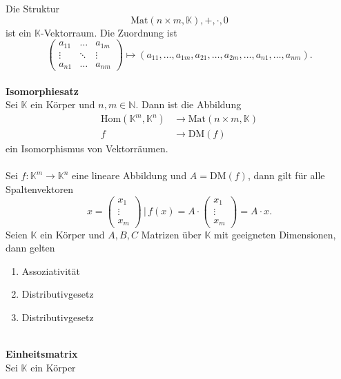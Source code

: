 \documentclass[a4paper,12pt]{article}
\newcommand{\RN}[1]{\uppercase\expandafter{\romannumeral#1}}
\numberwithin{equation}{section}
\begin{document}
Die Struktur 
\[ 
        \text{Mat}\left(n\times m,\mathbb{K}\right),+,\cdot ,0
\] 
ist ein $\mathbb{K}$-Vektorraum. Die Zuordnung ist
\[ 
        \left(\begin{matrix}
                        a_{11}&\hdots &a_{1m}\\\vdots&\ddots&\vdots\\a_{n1}&\hdots &a_{nm}
        \end{matrix}\right)\mapsto\left(a_{11},\hdots ,a_{1m},a_{21},\hdots ,a_{2m},\hdots ,a_{n1},\hdots ,a_{nm}\right)
.\] 
\hfill\\\textbf{Isomorphiesatz}\\ 
Sei $\mathbb{K}$ ein Körper und $n,m \in \mathbb{N}$. Dann ist die Abbildung
\begin{align*}
        \text{Hom}\left(\mathbb{K}^{m},\mathbb{K}^{n}\right)&\rightarrow \text{Mat}\left(n\times m,\mathbb{K}\right)\\
        f&\rightarrow \text{DM}\left(f\right)
\end{align*}
ein Isomorphismus von Vektorräumen.\\\\
Sei $f:\mathbb{K}^{m}\rightarrow \mathbb{K}^{n}$ eine lineare Abbildung und $A=\text{DM}\left(f\right)$, dann gilt für alle Spaltenvektoren
\[ 
        x=\left(\begin{matrix}
                x_1\\\vdots \\x_m
        \end{matrix}\right)\,|\, f\left(x\right)=A\cdot \left(\begin{matrix}
                x_1\\\vdots\\x_m
        \end{matrix}\right)=A\cdot x
.\] 
Seien $\mathbb{K}$ ein Körper und $A,B,C$ Matrizen über $\mathbb{K}$ mit geeigneten Dimensionen, dann gelten
\begin{enumerate}[label=(\alph*)]
        \item Assoziativität
        \item Distributivgesetz \RN1
        \item Distributivgesetz \RN2
\end{enumerate}
\hfill\\\textbf{Einheitsmatrix}\\ 
Sei $\mathbb{K}$ ein Körper
\end{document}
